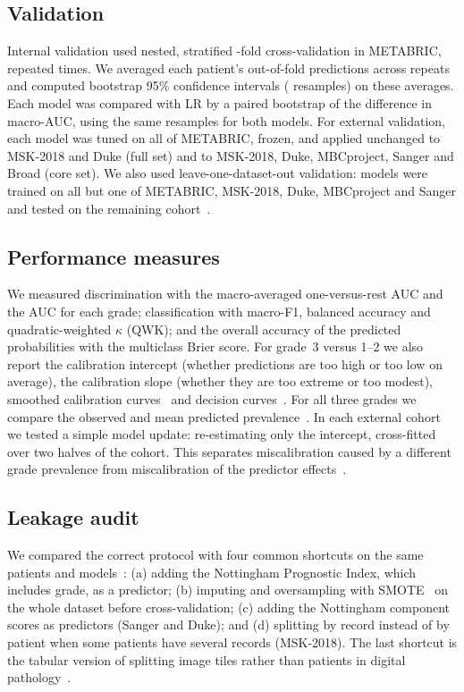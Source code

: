 \subsection{Validation}
Internal validation used nested, stratified \Folds-fold cross-validation in METABRIC, repeated
\Repeats{} times. We averaged each patient's out-of-fold predictions across repeats and computed
bootstrap 95\% confidence intervals (\Boot{} resamples) on these averages. Each model was compared
with LR by a paired bootstrap of the difference in macro-AUC, using the same resamples for both
models. For external validation, each model was tuned on all of METABRIC, frozen, and applied
unchanged to MSK-2018 and Duke (full set) and to MSK-2018, Duke, MBCproject, Sanger and Broad (core
set). We also used leave-one-dataset-out validation: models were trained on all but one of METABRIC,
MSK-2018, Duke, MBCproject and Sanger and tested on the remaining
cohort~\citep{steyerberg2016validation}.

\subsection{Performance measures}
We measured discrimination with the macro-averaged one-versus-rest AUC and the AUC for each grade;
classification with macro-F1, balanced accuracy and quadratic-weighted $\kappa$ (QWK); and the overall
accuracy of the predicted probabilities with the multiclass Brier score. For grade~3 versus 1--2 we
also report the calibration intercept (whether predictions are too high or too low on average), the
calibration slope (whether they are too extreme or too modest), smoothed calibration
curves~\citep{vancalster2019calibration} and decision curves~\citep{vickers2006dca}. For all three
grades we compare the observed and mean predicted prevalence~\citep{vanhoorde2014multinomial}. In
each external cohort we tested a simple model update: re-estimating only the intercept, cross-fitted
over two halves of the cohort. This separates miscalibration caused by a different grade prevalence
from miscalibration of the predictor effects~\citep{riley2024evalpart2}.

\subsection{Leakage audit}
We compared the correct protocol with four common shortcuts on the same patients and
models~\citep{kapoor2023leakage}: (a) adding the Nottingham Prognostic Index, which includes grade,
as a predictor; (b) imputing and oversampling with SMOTE~\citep{chawla2002smote} on the whole dataset
before cross-validation; (c) adding the Nottingham component scores as predictors (Sanger and Duke);
and (d) splitting by record instead of by patient when some patients have several records
(MSK-2018). The last shortcut is the tabular version of splitting image tiles rather than patients in
digital pathology~\citep{bussola2019slipping}.

